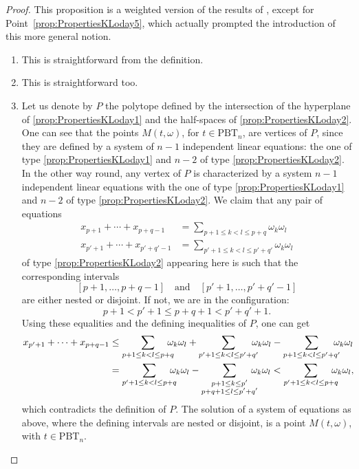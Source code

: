 \documentclass[10pt,a4paper]{amsart}
\numberwithin{equation}{section}\providecommand{\No}{}
\theoremstyle{plain}
\theoremstyle{definition}
\newcommand{\Tam}[1]{\mathrm{PBT}_{#1}}
\begin{document}
\begin{proof}
This proposition is a weighted version of the results of \cite{Loday04a}, except for Point~\eqref{prop:PropertiesKLoday5}, which actually prompted the introduction of this more general notion.
\leavevmode
\begin{enumerate}
\item This is straightforward from the definition.
\item This is straightforward too.
\item Let us denote by $P$ the polytope defined by the intersection of the hyperplane of \eqref{prop:PropertiesKLoday1} and the half-spaces of \eqref{prop:PropertiesKLoday2}.
One can see that the points $M(t, \omega)$, for $t\in \Tam{n}$, are vertices of $P$, since they are defined by a system of $n-1$ independent linear equations: the one of type \eqref{prop:PropertiesKLoday1} and $n-2$ of type \eqref{prop:PropertiesKLoday2}.
In the other way round, any vertex of $P$ is characterized by a system $n-1$ independent linear equations with the one of type \eqref{prop:PropertiesKLoday1} and $n-2$ of type \eqref{prop:PropertiesKLoday2}. We claim that any pair of equations
\begin{align*}
x_{p+1}+\cdots+x_{p+q-1}&= \sum_{p+1\leq k<l\leq p+q} \omega_k \omega_l\\
\tag*{and}
x_{p'+1}+\cdots+x_{p'+q'-1}&= \sum_{p'+1\leq k<l\leq p'+q'} \omega_k \omega_l
\end{align*}
of type \eqref{prop:PropertiesKLoday2} appearing here is such that the corresponding intervals
\[
[p+1, \ldots, p+q-1]\quad\text{and}\quad [p'+1, \ldots, p'+q'-1]
\]
are either nested or disjoint.
If not, we are in the configuration:
\[
p+1<p'+1\leq p+q+1<p'+q'+1.
\]
Using these equalities and the defining inequalities of $P$, one can get
\begin{align*}
x_{p'+1}+\cdots+x_{p+q-1}&\leq
\sum_{p+1\leq k<l\leq p+q}\hspace*{-3mm} \omega_k \omega_l
+\sum_{p'+1\leq k<l\leq p'+q'}\hspace*{-3mm} \omega_k \omega_l
-\sum_{p+1\leq k<l\leq p'+q'}\hspace*{-3mm} \omega_k \omega_l \\
&=
\sum_{p'+1\leq k<l\leq p+q}\hspace*{-3mm} \omega_k \omega_l
-
\sum_{\substack{p+1\leq k\leq p'\\ p+q+1\leq l\leq p'+q'}}\hspace*{-3mm} \omega_k \omega_l
< \sum_{p'+1\leq k<l\leq p+q}\hspace*{-3mm} \omega_k \omega_l,
\end{align*}
which contradicts the definition of $P$.
The solution of a system of equations as above, where the defining intervals are nested or disjoint, is a point
$M(t,\omega)$, with
$t\in \Tam{n}$.


\end{enumerate}
\end{proof}
\end{document}
